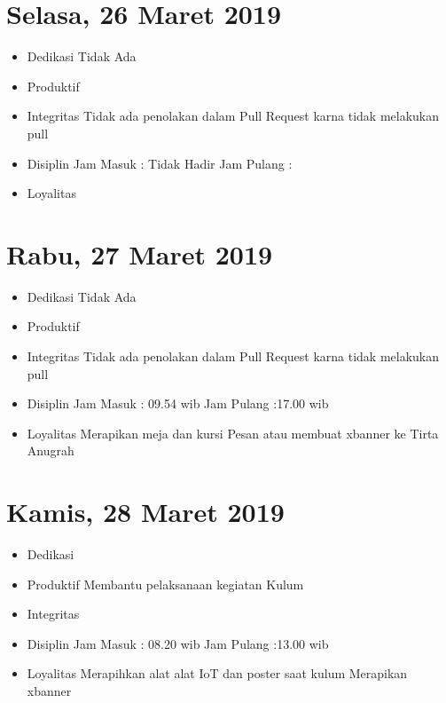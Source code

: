\section{Selasa, 26 Maret 2019}
\begin{itemize}
\item Dedikasi
\subitem Tidak Ada

\item Produktif
 
\item Integritas
  \subitem Tidak ada penolakan dalam Pull Request karna tidak melakukan pull
\item Disiplin
  \subitem Jam Masuk : Tidak Hadir
  \subitem Jam Pulang :
\item Loyalitas
  \subitem 
\end{itemize}

\section{Rabu, 27 Maret 2019}
\begin{itemize}
\item Dedikasi
\subitem Tidak Ada
\item Produktif
  \subitem 
\item Integritas
  \subitem Tidak ada penolakan dalam Pull Request karna tidak melakukan pull
\item Disiplin
  \subitem Jam Masuk : 09.54 wib
  \subitem Jam Pulang :17.00 wib
\item Loyalitas
  \subitem Merapikan meja dan kursi
  \subitem Pesan atau membuat xbanner ke Tirta Anugrah
\end{itemize}

\section{Kamis, 28 Maret 2019}
\begin{itemize}
\item Dedikasi

\item Produktif
  \subitem Membantu pelaksanaan kegiatan Kulum

\item Integritas
  
\item Disiplin
  \subitem Jam Masuk : 08.20 wib
  \subitem Jam Pulang :13.00 wib
\item Loyalitas
  \subitem Merapihkan alat alat IoT dan poster saat kulum
  \subitem Merapikan xbanner
\end{itemize}


